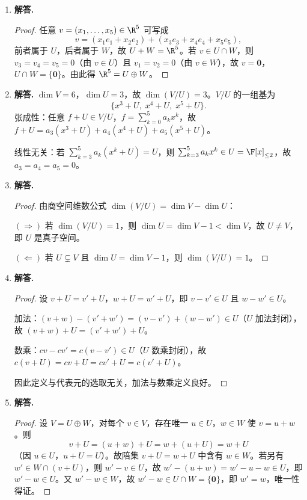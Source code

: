 \begin{enumerate}[label=\textbf{\arabic*.}, leftmargin=*, itemsep=1em]
张成 $U$：设 $u=(u_1,\dots,u_n)\in U$（$\sum u_j=0$），验证 $u=\sum_{i=1}^{n-1}(\sum_{j=1}^iu_j)\,v_i$（直接展开即得）。

故 $\{e_1-e_2,e_2-e_3,\dots,e_{n-1}-e_n\}$ 是 $U$ 的一组基，$\dim U=n-1$。

\item \textbf{解答.}
\begin{proof}
任意 $v=(x_1,\dots,x_5)\in\R^5$ 可写成
\[
v=(x_1e_1+x_2e_2)+(x_3e_3+x_4e_4+x_5e_5),
\]
前者属于 $U$，后者属于 $W$，故 $U+W=\R^5$。若 $v\in U\cap W$，则 $v_3=v_4=v_5=0$（由 $v\in U$）且 $v_1=v_2=0$（由 $v\in W$），故 $v=\mathbf{0}$，$U\cap W=\{\mathbf{0}\}$。由此得 $\R^5=U\oplus W$。
\end{proof}

\item \textbf{解答.}
$\dim V=6$，$\dim U=3$，故 $\dim(V/U)=3$。$V/U$ 的一组基为
\[
\{x^3+U,\;x^4+U,\;x^5+U\}.
\]
张成性：任意 $f+U\in V/U$，$f=\sum_{k=0}^5 a_kx^k$，故 $f+U=a_3(x^3+U)+a_4(x^4+U)+a_5(x^5+U)$。

线性无关：若 $\sum_{k=3}^5 a_k(x^k+U)=U$，则 $\sum_{k=3}^5a_kx^k\in U=\F[x]_{\le 2}$，故 $a_3=a_4=a_5=0$。

\item \textbf{解答.}
\begin{proof}
由商空间维数公式 $\dim(V/U)=\dim V-\dim U$：

$(\Rightarrow)$ 若 $\dim(V/U)=1$，则 $\dim U=\dim V-1<\dim V$，故 $U\ne V$，即 $U$ 是真子空间。

$(\Leftarrow)$ 若 $U\subsetneq V$ 且 $\dim U=\dim V-1$，则 $\dim(V/U)=1$。
\end{proof}

\item \textbf{解答.}
\begin{proof}
设 $v+U=v'+U$，$w+U=w'+U$，即 $v-v'\in U$ 且 $w-w'\in U$。

加法：$(v+w)-(v'+w')=(v-v')+(w-w')\in U$（$U$ 加法封闭），故 $(v+w)+U=(v'+w')+U$。

数乘：$cv-cv'=c(v-v')\in U$（$U$ 数乘封闭），故 $c(v+U)=cv+U=cv'+U=c(v'+U)$。

因此定义与代表元的选取无关，加法与数乘定义良好。
\end{proof}

\item \textbf{解答.}
\begin{proof}
设 $V=U\oplus W$，对每个 $v\in V$，存在唯一 $u\in U$，$w\in W$ 使 $v=u+w$。则
\[
v+U=(u+w)+U=w+(u+U)=w+U
\]
（因 $u\in U$，$u+U=U$）。故陪集 $v+U=w+U$ 中含有 $w\in W$。若另有 $w'\in W\cap(v+U)$，则 $w'-v\in U$，故 $w'-(u+w)=w'-u-w\in U$，即 $w'-w\in U$。又 $w'-w\in W$，故 $w'-w\in U\cap W=\{\mathbf{0}\}$，即 $w'=w$，唯一性得证。


\end{proof}
\end{enumerate}
